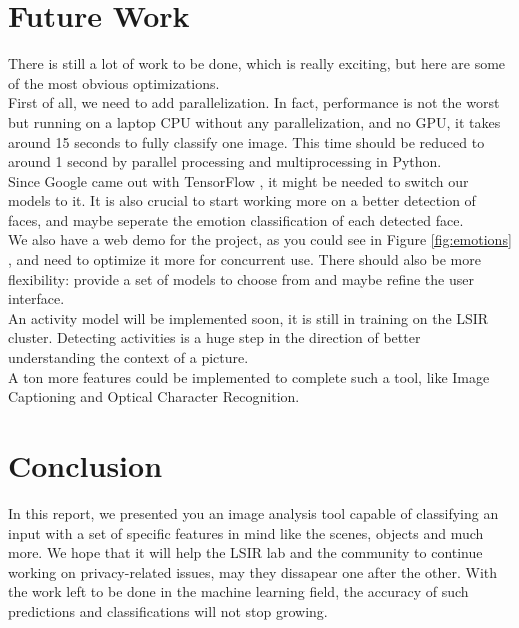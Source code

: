 \documentclass{article}
\begin{document}
\section{Future Work}
    There is still a lot of work to be done, which is really exciting, but here are some of the most obvious optimizations. 
    \\First of all, we need to add parallelization. In fact, performance is not the worst but running on a laptop CPU without any parallelization, and no GPU, it takes around 15 seconds to fully classify one image. This time should be reduced to around 1 second by parallel processing and multiprocessing in Python. 
    \\Since Google came out with TensorFlow \cite{tensor}, it might be needed to switch our models to it. It is also crucial to start working more on a better detection of faces, and maybe seperate the emotion classification of each detected face. 
    \\We also have a web demo for the project, as you could see in Figure \ref{fig:emotions} \cite{demo}, and need to optimize it more for concurrent use. There should also be more flexibility: provide a set of models to choose from and maybe refine the user interface. 
    \\An activity model will be implemented soon, it is still in training on the LSIR cluster. 
    Detecting activities is a huge step in the direction of better understanding the context of a picture. 
    \\A ton more features could be implemented to complete such a tool, like Image Captioning and Optical Character Recognition.
\section{Conclusion}
    In this report, we presented you an image analysis tool capable of classifying an input with a set of specific features in mind like the scenes, objects and much more. We hope that it will help the LSIR lab \cite{lsir} and the community to continue working on privacy-related issues, may they dissapear one after the other. With the work left to be done in the machine learning field, the accuracy of such predictions and classifications will not stop growing.
\end{document}

